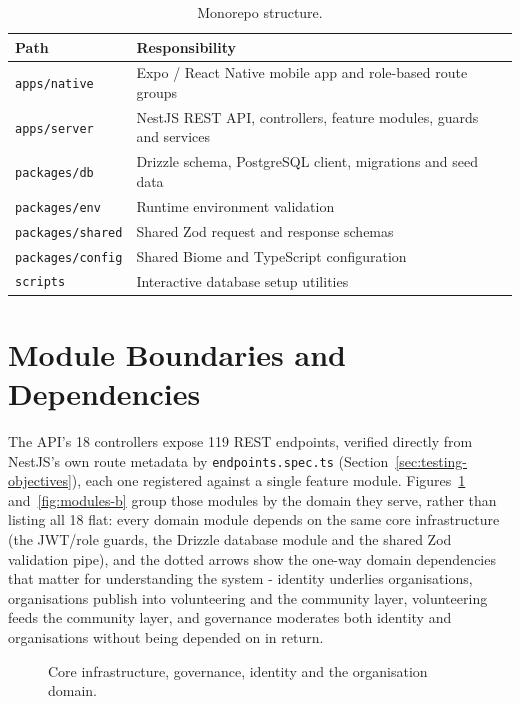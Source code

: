 \begin{table}[H]\centering
\caption{Monorepo structure.}
\label{tab:monorepo}
\begin{tabularx}{\textwidth}{|p{}|X|}
\hline
\textbf{Path} & \textbf{Responsibility}\\\hline
\texttt{apps/native} & Expo / React Native mobile app and role-based route groups\\\hline
\texttt{apps/server} & NestJS REST API, controllers, feature modules, guards and services\\\hline
\texttt{packages/db} & Drizzle schema, PostgreSQL client, migrations and seed data\\\hline
\texttt{packages/env} & Runtime environment validation\\\hline
\texttt{packages/shared} & Shared Zod request and response schemas\\\hline
\texttt{packages/config} & Shared Biome and TypeScript configuration\\\hline
\texttt{scripts} & Interactive database setup utilities\\\hline
\end{tabularx}
\end{table}

\section{Module Boundaries and Dependencies}
\label{sec:modules}
\noindent The API's 18 controllers expose 119 REST endpoints, verified directly from NestJS's own route metadata by \texttt{endpoints.spec.ts} (Section~\ref{sec:testing-objectives}), each one registered against a single feature module. Figures~\ref{fig:modules-a} and~\ref{fig:modules-b} group those modules by the domain they serve, rather than listing all 18 flat: every domain module depends on the same core infrastructure (the JWT/role guards, the Drizzle database module and the shared Zod validation pipe), and the dotted arrows show the one-way domain dependencies that matter for understanding the system - identity underlies organisations, organisations publish into volunteering and the community layer, volunteering feeds the community layer, and governance moderates both identity and organisations without being depended on in return.

\clearpage
\begin{figure}[H]
    \centering
    \caption{Core infrastructure, governance, identity and the organisation domain.}
    \label{fig:modules-a}
\end{figure}

